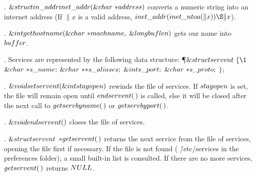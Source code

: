 \fi

. \CD{}$\&{struct}\ \\{in\_addr}\ \\{inet\_addr}(\&{char}\ {*}%
\\{address})$\DC{} converts a numeric string into an
internet address (If \CD{}$\|x$\DC{} is a valid address, \CD{}$\\{inet\_addr}(%
\\{inet\_ntoa}(\|x))\S\|x$\DC{}).

\fi

. \CD{}$\&{int}\ \\{gethostname}(\&{char}\ {*}\\{machname},\;\&{long}\ %
\\{buflen})$\DC{} gets our name into \CD{}$\\{buffer}$\DC{}.

\fi

. Services are represented by the following data structure:
\Y\P $\&{struct}\ \\{servent}\ \{\1$\6
$\&{char}\ {{*}}\\{s\_name};$\5
\6
$\&{char}\ {{*}}{{*}}\\{s\_aliases};$\5
\6
$\&{int}\ \\{s\_port};$\5
\6
$\&{char}\ {{*}}\\{s\_proto};$\5
\2\6
$\};$\par
\fi

. \CD{}$\&{void}\ \\{setservent}(\&{int}\ \\{stayopen})$\DC{} rewinds the
file of services. If \CD{}$\\{stayopen}$\DC{} is
set, the file will remain open until \CD{}$\\{endservent}(\,)$\DC{} is called,
else it will be
closed after the next call to \CD{}$\\{getservbyname}(\,)$\DC{} or \CD{}$%
\\{getservbyport}(\,)$\DC{}.

\fi

. \CD{}$\&{void}\ \\{endservent}()$\DC{} closes the file of services.

\fi

. \CD{}$\&{struct}\ \\{servent}$ ${{*}}\\{getservent}(\,)$\DC{} returns
the next service from the file of services,
opening the file first if necessary. If the file is not found (%
\.{/etc/services} in
the preferences folder), a small built-in list is consulted. If there are no
more services,
\CD{}$\\{getservent}(\,)$\DC{} returns \CD{}$\\{NULL}$\DC{}.

